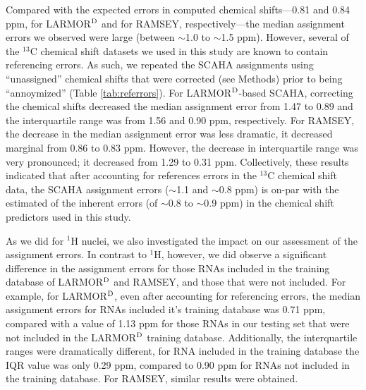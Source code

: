 \documentclass[journal=jcisd8,manuscript=article,layout=onecolumn]{achemso}
\begin{document}
Compared with the expected errors in computed chemical shifts---0.81 and 0.84 ppm, for LARMOR$^{\rm D}$ and for RAMSEY,  respectively---the median assignment errors we observed were large (between $\sim$1.0 to $\sim$1.5 ppm). However, several of the $^{13}$C chemical shift datasets we used in this study are known to contain referencing errors. As such, we repeated the SCAHA assignments using ``unassigned'' chemical shifts that were corrected (see Methods) prior to being ``annoymized'' (Table \ref{tab:referrors}). For LARMOR$^{\rm D}$-based SCAHA, correcting the chemical shifts decreased the median assignment error from 1.47 to 0.89 and  the interquartile range was from 1.56 and 0.90 ppm, respectively. For RAMSEY, the decrease in the median assignment error was less dramatic, it decreased marginal from 0.86 to 0.83 ppm. However, the decrease in interquartile range was very pronounced; it decreased from 1.29 to 0.31 ppm. Collectively, these results indicated that after accounting for references  errors in the $^{13}$C chemical shift data, the SCAHA assignment errors ($\sim$1.1 and $\sim$0.8 ppm) is on-par with the estimated of the inherent errors (of $\sim$0.8 to $\sim$0.9 ppm) in the chemical shift predictors  used in this study.  

As we did for $^{1}$H nuclei, we also investigated the impact on our assessment of the assignment errors. In contrast to $^{1}$H, however, we did observe a significant difference in the assignment errors for those RNAs included in the training database of LARMOR$^{\rm D}$ and RAMSEY, and those that were not included. For example, for LARMOR$^{\rm D}$, even after accounting for referencing errors, the median assignment errors for RNAs included it's training database was 0.71 ppm, compared with a value of 1.13 ppm for those RNAs in our testing set that were not included in the LARMOR$^{\rm D}$ training database.  Additionally, the interquartile ranges were dramatically different, for RNA included in the training database the IQR value was only 0.29 ppm, compared to 0.90 ppm for RNAs not included in the training database. For RAMSEY, similar results were obtained.
\end{document}
